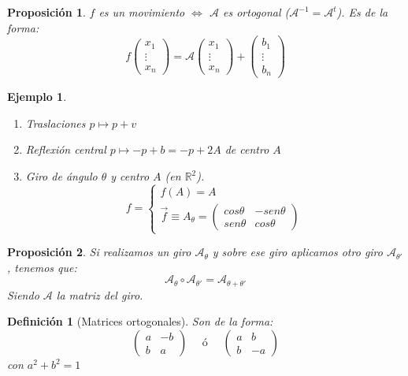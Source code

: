 \documentclass[11pt, a4paper, titlepage]{article}
\newcommand{\R}{\mathbb{R}}
\renewcommand{\vec}{\overrightarrow}
\theoremstyle{theorem-style}
\newtheorem{nprop}{Proposición}[section]
\theoremstyle{definition-style}
\newtheorem{ndef}{Definición}[section]
\theoremstyle{remark-style}
\theoremstyle{example-style}
\newtheorem{ejemplo}{Ejemplo}[section]
\newenvironment{nlist}
{\begin{enumerate}
    \renewcommand\labelenumi{(\emph{\roman{enumi})}}}
  {\end{enumerate}}
\begin{document}
\begin{nprop}
  $f$ es un movimiento $\iff$ $\mathcal A$ es ortogonal ($\mathcal A ^{-1}= \mathcal A ^t$). Es de la forma:
  \[
    f \begin{pmatrix}
      x_1\\
      \vdots\\
      x_n 
    \end{pmatrix} = \mathcal A \begin{pmatrix}
      x_1\\
      \vdots\\
      x_n 
    \end{pmatrix} + \begin{pmatrix}
      b_1\\
      \vdots\\
      b_n 
    \end{pmatrix}
  \]
\end{nprop}


\begin{ejemplo}
  \begin{nlist}
  \item Traslaciones $p \mapsto p+v$
  \item Reflexión central $p \mapsto -p +b= -p +2A$ de centro $A$
  \item Giro de ángulo $\theta$ y centro $A$ (en $\R^2$).
    \[
      f= \begin{cases}
	f(A) = A \\
	\vec{f} \equiv A_{\theta} = \begin{pmatrix}
          cos \theta & -sen \theta\\
          sen \theta & cos \theta
        \end{pmatrix} 
      \end{cases}
    \]
  \end{nlist}
\end{ejemplo}

\begin{nprop}
  Si realizamos un giro $\mathcal A_\theta$ y sobre ese giro aplicamos otro giro $\mathcal A_{\theta'}$, tenemos que:
  \[
    \mathcal A_{\theta} \circ \mathcal A_{\theta'} = \mathcal A_{\theta+\theta'}
  \]
  Siendo $\mathcal A$ la matriz del giro.
\end{nprop}

\begin{ndef}[Matrices ortogonales]
  Son de la forma:
  \[
    \begin{pmatrix}
      a & -b \\
      b & a 
    \end{pmatrix} \quad \text { ó } \quad \begin{pmatrix}
      a & b \\
      b & -a 
    \end{pmatrix}
  \]
  con $a^2+b^2 = 1$
\end{ndef}
\end{document}
